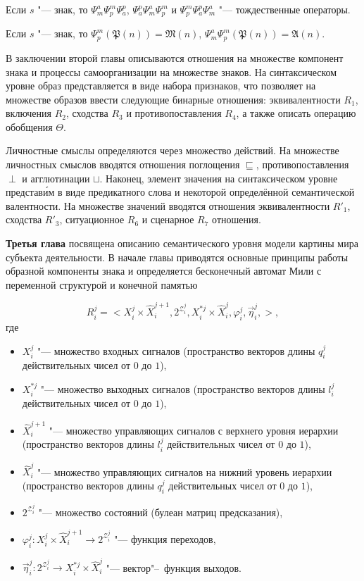 \begin{Pred}
	Если $s$ "--- знак, то  $\Psi_m^a\Psi_p^m\Psi_a^p$, $\Psi_a^p\Psi_m^a\Psi_p^m$ и $\Psi_p^m\Psi_a^p\Psi_m^a$ "--- тождественные операторы.
\end{Pred}

\begin{Pred}
	Если $s$ "--- знак, то $\Psi_p^m(\mathfrak P(n))=\mathfrak M(n)$, $\Psi_m^a\Psi_p^m(\mathfrak P(n))=\mathfrak A(n)$.
\end{Pred}	

В заключении второй главы описываются отношения на множестве компонент знака и процессы самоорганизации на множестве знаков. На синтаксическом уровне образ представляется в виде набора признаков, что позволяет на множестве образов ввести следующие бинарные отношения: эквивалентности $R_1$, включения $R_2$, сходства $R_3$ и противопоставления $R_4$, а также описать операцию обобщения $\Theta$.

Личностные смыслы определяются через множество действий. На множестве личностных смыслов вводятся отношения поглощения $\sqsubseteq$, противопоставления $\perp$ и агглютинации $\sqcup$. Наконец, элемент значения на синтаксическом уровне представ\'{и}м в виде предикатного слова и некоторой определённой семантической валентности. На множестве значений вводятся отношения эквивалентности $R'_1$, сходства $R'_3$, ситуационное $R_6$ и сценарное $R_7$ отношения.

\textbf{Третья глава} посвящена описанию семантического уровня модели картины мира субъекта деятельности. В начале главы приводятся основные принципы работы образной компоненты знака и определяется бесконечный автомат Мили с переменной структурой и конечной памятью 

\[
R_i^j=<X_i^j\times \hat{X}_i^{j+1}, 2^{\mathcal Z_i^j}, X_i^{*j}\times \hat{X}_i^j,\varphi_i^j,\vec\eta_i^j,>,
\]
где
\begin{itemize}
	\item $X_i^j$ "--- множество входных сигналов (пространство векторов длины $q_i^j$ действительных чисел от $0$ до $1$), 
	\item $X_i^{*j}$ "--- множество выходных сигналов (пространство векторов длины $l_i^j$ действительных чисел от $0$ до $1$), 
	\item $\hat{X}_i^{j+1}$ "--- множество управляющих сигналов с верхнего уровня иерархии (пространство векторов длины $l_i^j$ действительных чисел от $0$ до $1$),
	\item $\hat{X}_i^j$ "--- множество управляющих сигналов на нижний уровень иерархии (пространство векторов длины $q_i^j$ действительных чисел от $0$ до $1$),
	\item $2^{\mathcal Z_i^j}$ "--- множество состояний (булеан матриц предсказания),
	\item $\varphi_i^j:X_i^j\times \hat{X}_i^{j+1}\to 2^{\mathcal Z_i^j}$ "--- функция переходов,
	\item $\vec\eta_i^j:2^{\mathcal Z_i^j} \to X_i^{*j}\times \hat{X}_i^j$ "--- вектор"--~функция выходов.
\end{itemize}

